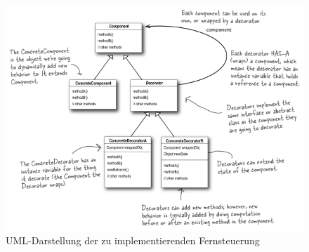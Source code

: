 \begin{figure}
	\centering
	\includegraphics{decorator/img/decoratorUML}
	\caption{UML-Darstellung der zu implementierenden Fernsteuerung}
	\label{fig:commandRemote}
\end{figure}
